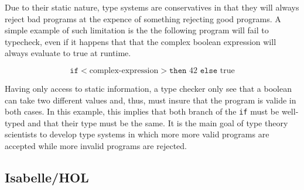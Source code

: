 Due to their static nature, type systems are conservatives in that they will always reject bad
programs at the expence of something rejecting good programs. A simple example of such limitation is
the the following program will fail to typecheck, even if it happens that that the complex boolean
expression will always evaluate to true at runtime.

\begin{displaymath}
  \texttt{if} <\text{complex-expression}> \texttt{then } 42 \texttt{ else } \text{true}
\end{displaymath}

Having only access to static information, a type checker only see that a boolean can take two
different values and, thus, must insure that the program is valide in both cases. In this example,
this implies that both branch of the \texttt{if} must be well-typed and that their type must be the
same. It is the main goal of type theory scientists to develop type systems in which more more valid
programs are accepted while more invalid programs are rejected.

\subsection{Isabelle/HOL}


